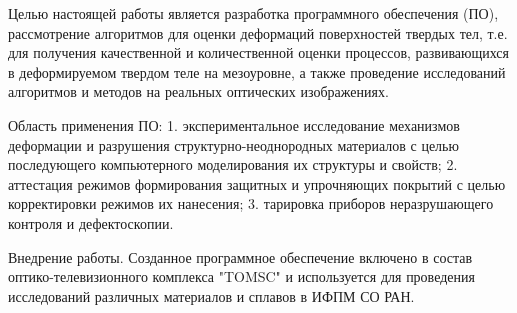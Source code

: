 Целью настоящей работы является разработка программного обеспечения (ПО), рассмотрение алгоритмов для оценки деформаций поверхностей твердых тел, т.е. для получения качественной и количественной оценки процессов, развивающихся в деформируемом твердом теле на мезоуровне, а также проведение исследований алгоритмов и методов на реальных оптических изображениях.

Область применения ПО:
1. экспериментальное исследование механизмов деформации и разрушения структурно-неоднородных материалов с целью последующего компьютерного моделирования их структуры и свойств;
2. аттестация режимов формирования защитных и упрочняющих покрытий с целью корректировки режимов их нанесения;
3. тарировка приборов неразрушающего контроля и дефектоскопии.

Внедрение работы. Созданное программное обеспечение включено в состав оптико-телевизионного комплекса "TOMSC" и используется для проведения исследований различных материалов и сплавов в ИФПМ СО РАН.